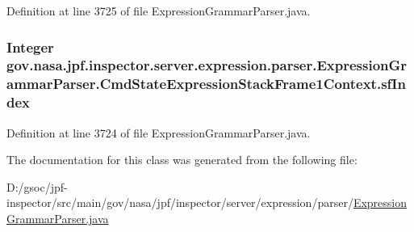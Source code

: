 Definition at line 3725 of file Expression\+Grammar\+Parser.\+java.

\subsubsection[{\texorpdfstring{sf\+Index}{sfIndex}}]{\setlength{\rightskip}{0pt plus 5cm}Integer gov.\+nasa.\+jpf.\+inspector.\+server.\+expression.\+parser.\+Expression\+Grammar\+Parser.\+Cmd\+State\+Expression\+Stack\+Frame1\+Context.\+sf\+Index}\hypertarget{classgov_1_1nasa_1_1jpf_1_1inspector_1_1server_1_1expression_1_1parser_1_1_expression_grammar_pabec1adacda521b9e6ed9ea64caf537b4_a04620c03249e818b4d6e8467b8f2c9d8}{}\label{classgov_1_1nasa_1_1jpf_1_1inspector_1_1server_1_1expression_1_1parser_1_1_expression_grammar_pabec1adacda521b9e6ed9ea64caf537b4_a04620c03249e818b4d6e8467b8f2c9d8}


Definition at line 3724 of file Expression\+Grammar\+Parser.\+java.



The documentation for this class was generated from the following file\+:\begin{DoxyCompactItemize}
\item 
D\+:/gsoc/jpf-\/inspector/src/main/gov/nasa/jpf/inspector/server/expression/parser/\hyperlink{_expression_grammar_parser_8java}{Expression\+Grammar\+Parser.\+java}\end{DoxyCompactItemize}

